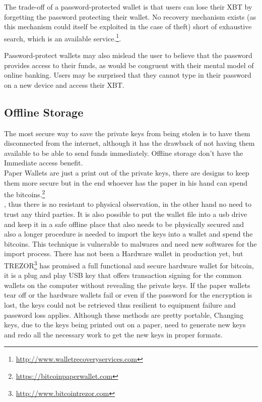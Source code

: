 The trade-off of a password-protected wallet is that users can lose their XBT by forgetting the password protecting their wallet. No recovery mechanism exists (as this mechanism could itself be exploited in the case of theft) short of exhaustive search, which is an available service.\footnote{\url{http://www.walletrecoveryservices.com}}.

Password-protect wallets may also mislead the user to believe that the password provides access to their funds, as would be congruent with their mental model of online banking. Users may be surprised that they cannot type in their password on a new device and access their XBT. 

\subsection{Offline Storage}
\label{sec:offline storage}
The most secure way to save the private keys from being stolen is to have them disconnected from the internet, although it has the drawback of not having them available to be able to send funds immediately. Offline storage don't have the Immediate access benefit.\\
Paper Wallets are just a print out of the private keys, there are designs to keep them more secure but in the end whoever has the paper in his hand can spend the bitcoins.\footnote{\url {https://bitcoinpaperwallet.com}}\\, thus there is no resistant to physical observation, in the other hand no need to trust any third parties.
It is also possible to put the wallet file into a usb drive and keep it in a safe offline place that also needs to be physically secured and also a longer procedure is needed to import the keys into a wallet and spend the bitcoins. This technique is vulnerable to malwares and need new softwares for the import process. There has not been a Hardware wallet in production yet, but TREZOR\footnote{\url {http://www.bitcointrezor.com}} has promised a full functional and secure hardware wallet for bitcoin, it is a plug and play USB key that offers transaction signing for the common wallets on the computer without revealing the private keys. If the paper wallets tear off or the hardware wallets fail or even if the password for the encryption is lost, the keys could not be retrieved thus resilient to equipment failure and password loss applies. Although these methods are pretty portable, Changing keys, due to the keys being printed out on a paper, need to generate new keys and redo all the necessary work to get the new keys in proper formats.

